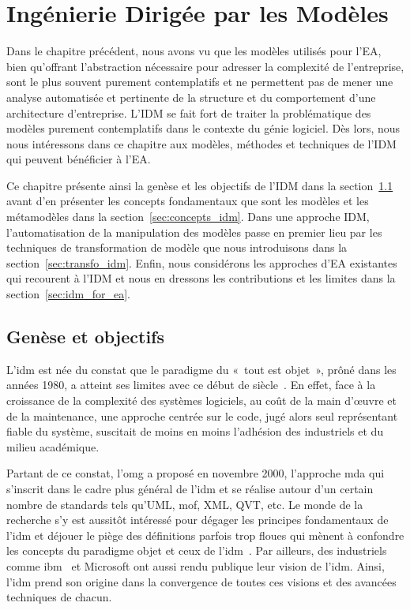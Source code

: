 \chapter{Ingénierie Dirigée par les Modèles}
\label{ch:IDM}
 
\PartialToc

Dans le chapitre précédent, nous avons vu que les modèles utilisés pour l'EA,
bien qu'offrant l'abstraction nécessaire pour adresser la complexité de l'entreprise, sont le
plus souvent purement contemplatifs et ne permettent pas de mener une analyse automatisée et pertinente 
de la structure et du comportement d'une architecture d'entreprise. L'IDM se fait fort de traiter la problématique
des modèles purement contemplatifs dans le contexte du génie logiciel. Dès lors, nous nous intéressons dans ce chapitre 
aux modèles, méthodes et techniques de l'IDM qui peuvent bénéficier à l'EA.


Ce chapitre présente ainsi la genèse et les objectifs de l'IDM dans la section~\ref{sec:genese_idm} avant 
d'en présenter les concepts fondamentaux que sont les modèles et les métamodèles
dans la section~\ref{sec:concepts_idm}. Dans une approche IDM, l'automatisation de la manipulation des modèles passe en premier
lieu par les techniques de transformation de modèle que nous introduisons dans la section~\ref{sec:transfo_idm}. Enfin, nous considérons
les approches d'EA existantes qui recourent à l'IDM et nous en dressons les contributions et les limites dans la section~\ref{sec:idm_for_ea}. 

\section{Genèse et objectifs}
\label{sec:genese_idm}

L'\gls{idm} est née du constat que le paradigme du «~tout est objet~», prôné dans les années 1980, a atteint ses limites avec ce début de siècle~\cite{greenfield2004software}. En effet, face à la croissance de la complexité des systèmes logiciels, au coût de la main d'œuvre et de la maintenance, une approche centrée sur le code, jugé alors seul représentant 
fiable du système, suscitait de moins en moins l'adhésion des industriels et du 
milieu académique. 

Partant de ce constat, l'\gls{omg} a proposé en novembre 
2000, l'approche \gls{mda} qui s'inscrit dans le cadre 
plus général de l'\gls{idm} et se réalise autour d'un certain nombre de standards tels 
qu'UML, \gls{mof}, XML, QVT, etc. Le monde de la recherche s'y est aussitôt intéressé 
pour dégager les principes fondamentaux de l'\gls{idm} 
\cite{bezivin2001towards, kent2002model, de2002using} et déjouer le 
piège des définitions parfois trop floues qui mènent à confondre les 
concepts du paradigme objet et ceux de l'\gls{idm}~\cite{bezivin2004search}. Par 
ailleurs, des industriels comme \gls{ibm}~\cite{booch2004mda} et Microsoft 
\cite{greenfield2004software} ont aussi rendu publique leur vision de l'\gls{idm}. 
Ainsi, l'\gls{idm} prend son origine dans la convergence de toutes ces visions et des 
avancées techniques de chacun.

